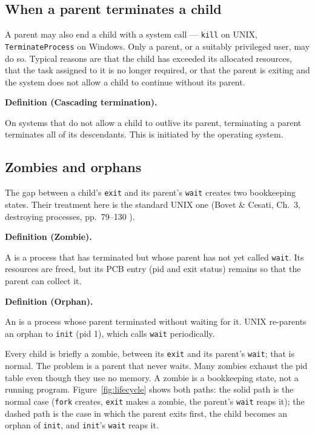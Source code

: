 \documentclass[11pt]{article}
\newenvironment{definitionbox}[1]{%
  \par\noindent\textbf{Definition (#1).}\ \itshape
}{\par\vspace{0.3em}}
\begin{document}
\subsection{When a parent terminates a child}

A parent may also end a child with a system call --- \texttt{kill} on UNIX,
\texttt{TerminateProcess} on Windows. Only a parent, or a suitably privileged
user, may do so. Typical reasons \cite{SilberschatzOSC_operating_system_concepts}
are that the child has exceeded its allocated resources, that the task assigned
to it is no longer required, or that the parent is exiting and the system does
not allow a child to continue without its parent.

\begin{definitionbox}{Cascading termination}
On systems that do not allow a child to outlive its parent, terminating a
parent terminates all of its descendants. This  is
initiated by the operating system.
\end{definitionbox}

\subsection{Zombies and orphans}

The gap between a child's \texttt{exit} and its parent's \texttt{wait} creates
two bookkeeping states. Their treatment here is the standard UNIX one
(Bovet \& Cesati, Ch.~3, destroying processes, pp.~79--130
\cite{BovetCesati_understanding_linux_kernel}).

\begin{definitionbox}{Zombie}
A  is a process that has terminated but whose parent has not yet
called \texttt{wait}. Its resources are freed, but its PCB entry (pid and exit
status) remains so that the parent can collect it.
\end{definitionbox}

\begin{definitionbox}{Orphan}
An  is a process whose parent terminated without waiting for it.
UNIX re-parents an orphan to \texttt{init} (pid 1), which calls \texttt{wait}
periodically.
\end{definitionbox}

Every child is briefly a zombie, between its \texttt{exit} and its parent's
\texttt{wait}; that is normal. The problem is a parent that never waits. Many
zombies exhaust the pid table even though they use no memory. A zombie is a
bookkeeping state, not a running program. Figure~\ref{fig:lifecycle} shows both
paths: the solid path is the normal case (\texttt{fork} creates, \texttt{exit}
makes a zombie, the parent's \texttt{wait} reaps it); the dashed path is the
case in which the parent exits first, the child becomes an orphan of
\texttt{init}, and \texttt{init}'s \texttt{wait} reaps it.
\end{document}
